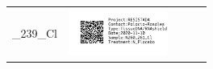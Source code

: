 \documentclass[10pt,notitlepage,letterpaper]{article}
\def\s{\phantom{xx}}
\def\w{1.27in}
\def\h{-0.030in}
\begin{document}
\begin{tabular}[t]{ c @{\s} c @{\s} c @{\s} c @{\s} c }
_239_Cl} & \includegraphics[width=\w]{label_N260_261_Cl} \\[\h]

\end{tabular}
\end{document}
